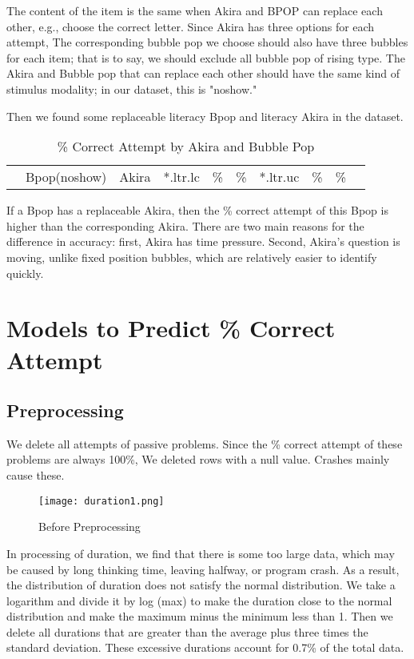 \documentclass[hyperref]{ctexart}
\begin{document}
\begin{multicols}{2}
 
The content of the item is the same when Akira and BPOP can replace each other, e.g., choose the correct letter. Since Akira has three options for each attempt, The corresponding bubble pop we choose should also have three bubbles for each item; that is to say, we should exclude all bubble pop of rising type. The Akira and Bubble pop that can replace each other should have the same kind of stimulus modality; in our dataset, this is "noshow."
 
Then we found some replaceable literacy Bpop and literacy Akira in the dataset.
\begin{table}[H]
  \begin{tabular}{lll}
    \hline{}
    &\quad\quad Bpop(noshow)\quad\quad&\quad\quad Akira\quad\quad\quad&
    \hline
    *.ltr.lc&       \quad\quad {}\%& \quad{}\%&
    *.ltr.uc&       \quad\quad {}\%& \quad{}\%&
    \hline{}
  \end{tabular}
  \caption{\% Correct Attempt by Akira and Bubble Pop}
\end{table}

If a Bpop has a replaceable Akira, then the \% correct attempt of this Bpop is higher than the corresponding Akira. There are two main reasons for the difference in accuracy: first, Akira has time pressure. Second, Akira's question is moving, unlike fixed position bubbles, which are relatively easier to identify quickly.
	

\section{Models to Predict \% Correct Attempt}
\subsection{Preprocessing}
We delete all attempts of passive problems. Since the \% correct attempt of these problems are always 100\%, We deleted rows with a null value. Crashes mainly cause these.

    \begin{figure}[H]
    \small
    \centering
    \texttt{[image: duration1.png]}
    \caption{Before Preprocessing} \label{fig:aa}
    \end{figure}
    
    
In processing of duration, we find that there is some too large data, which may be caused by long thinking time, leaving halfway, or program crash. As a result, the distribution of duration does not satisfy the normal distribution. We take a logarithm and divide it by log (max) to make the duration close to the normal distribution and make the maximum minus the minimum less than 1. Then we delete all durations that are greater than the average plus three times the standard deviation. These excessive durations account for 0.7\% of the total data.


\end{multicols}
\end{document}
